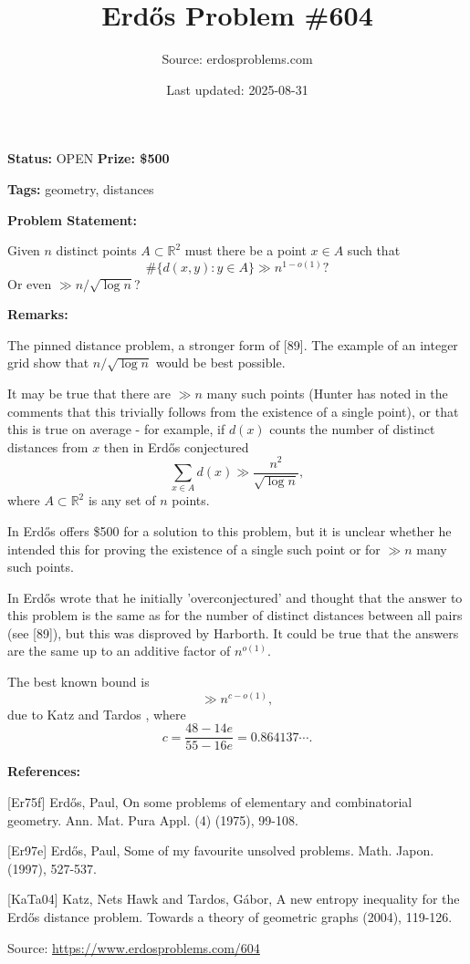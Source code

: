 \documentclass{article}
\title{Erd\H{o}s Problem \#604}
\date{Last updated: 2025-08-31}
\author{Source: erdosproblems.com}
\begin{document}
\maketitle

\noindent\textbf{Status:} OPEN \quad \textbf{Prize: \$500}

\noindent\textbf{Tags:} geometry, distances

\medskip
\noindent\textbf{Problem Statement:}

Given $n$ distinct points $A\subset\mathbb{R}^2$ must there be a point $x\in A$ such that\[\#\{ d(x,y) : y \in A\} \gg n^{1-o(1)}?\]Or even $\gg n/\sqrt{\log n}$?

\bigskip
\noindent\textbf{Remarks:}

The pinned distance problem, a stronger form of [89]. The example of an integer grid show that $n/\sqrt{\log n}$ would be best possible.

It may be true that there are $\gg n$ many such points (Hunter has noted in the comments that this trivially follows from the existence of a single point), or that this is true on average - for example, if $d(x)$ counts the number of distinct distances from $x$ then in \cite{Er75f} Erd\H{o}s conjectured\[\sum_{x\in A}d(x) \gg \frac{n^2}{\sqrt{\log n}},\]where $A\subset \mathbb{R}^2$ is any set of $n$ points.

In \cite{Er97e} Erd\H{o}s offers \$500 for a solution to this problem, but it is unclear whether he intended this for proving the existence of a single such point or for $\gg n$ many such points.

In \cite{Er97e} Erd\H{o}s wrote that he initially 'overconjectured' and thought that the answer to this problem is the same as for the number of distinct distances between all pairs (see [89]), but this was disproved by Harborth. It could be true that the answers are the same up to an additive factor of $n^{o(1)}$.

The best known bound is\[\gg n^{c-o(1)},\]due to Katz and Tardos \cite{KaTa04}, where\[c=\frac{48-14e}{55-16e}=0.864137\cdots.\]

\bigskip
\noindent\textbf{References:}

[Er75f] Erd\H{o}s, Paul, On some problems of elementary and combinatorial geometry. Ann. Mat. Pura Appl. (4) (1975), 99-108.
 
 [Er97e] Erd\H{o}s, Paul, Some of my favourite unsolved problems. Math. Japon. (1997), 527-537.
 
 [KaTa04] Katz, Nets Hawk and Tardos, G\'{a}bor, A new entropy inequality for the Erd\H{o}s distance problem. Towards a theory of geometric graphs (2004), 119-126.

\bigskip
\noindent\small{Source: \url{https://www.erdosproblems.com/604}}
\end{document}
